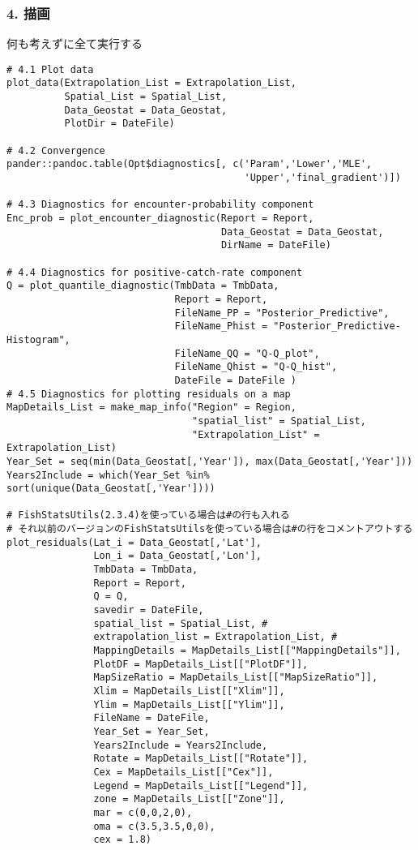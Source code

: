 \documentclass[]{article}
\begin{document}
\hypertarget{ux63cfux753b}{%
\subsubsection{4. 描画}\label{ux63cfux753b}}

何も考えずに全て実行する

\begin{verbatim}
# 4.1 Plot data
plot_data(Extrapolation_List = Extrapolation_List,
          Spatial_List = Spatial_List,
          Data_Geostat = Data_Geostat,
          PlotDir = DateFile)

# 4.2 Convergence
pander::pandoc.table(Opt$diagnostics[, c('Param','Lower','MLE',
                                         'Upper','final_gradient')])

# 4.3 Diagnostics for encounter-probability component
Enc_prob = plot_encounter_diagnostic(Report = Report,
                                     Data_Geostat = Data_Geostat,
                                     DirName = DateFile)

# 4.4 Diagnostics for positive-catch-rate component
Q = plot_quantile_diagnostic(TmbData = TmbData,
                             Report = Report,
                             FileName_PP = "Posterior_Predictive",
                             FileName_Phist = "Posterior_Predictive-Histogram",
                             FileName_QQ = "Q-Q_plot",
                             FileName_Qhist = "Q-Q_hist",
                             DateFile = DateFile )
# 4.5 Diagnostics for plotting residuals on a map
MapDetails_List = make_map_info("Region" = Region,
                                "spatial_list" = Spatial_List,
                                "Extrapolation_List" = Extrapolation_List)
Year_Set = seq(min(Data_Geostat[,'Year']), max(Data_Geostat[,'Year']))
Years2Include = which(Year_Set %in% sort(unique(Data_Geostat[,'Year'])))

# FishStatsUtils(2.3.4)を使っている場合は#の行も入れる
# それ以前のバージョンのFishStatsUtilsを使っている場合は#の行をコメントアウトする
plot_residuals(Lat_i = Data_Geostat[,'Lat'],
               Lon_i = Data_Geostat[,'Lon'],
               TmbData = TmbData,
               Report = Report,
               Q = Q,
               savedir = DateFile,
               spatial_list = Spatial_List, #
               extrapolation_list = Extrapolation_List, #
               MappingDetails = MapDetails_List[["MappingDetails"]],
               PlotDF = MapDetails_List[["PlotDF"]],
               MapSizeRatio = MapDetails_List[["MapSizeRatio"]],
               Xlim = MapDetails_List[["Xlim"]],
               Ylim = MapDetails_List[["Ylim"]],
               FileName = DateFile,
               Year_Set = Year_Set,
               Years2Include = Years2Include,
               Rotate = MapDetails_List[["Rotate"]],
               Cex = MapDetails_List[["Cex"]],
               Legend = MapDetails_List[["Legend"]],
               zone = MapDetails_List[["Zone"]],
               mar = c(0,0,2,0),
               oma = c(3.5,3.5,0,0),
               cex = 1.8)


\end{verbatim}
\end{document}
